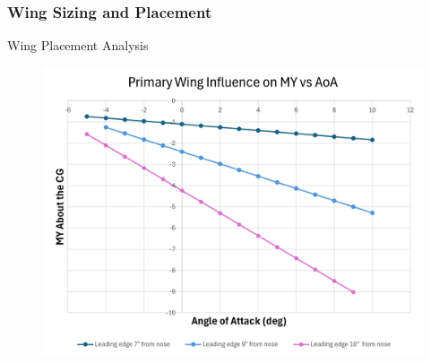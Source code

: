 \documentclass{beamer}
\newcommand{\setpresentername}[1]{\renewcommand{\presentername}{#1}}
\newcommand{\setpresentertitle}[1]{\renewcommand{\presentertitle}{#1}}
\newcommand{\presentername}{}
\newcommand{\presentertitle}{}
\begin{document}
    \subsubsection{Wing Sizing and Placement}
    \setpresentername{Thomas Housley}
    \setpresentertitle{Lead Flight Performance Engineer}
    \begin{frame}{Wing Placement Analysis}
    \begin{figure}
        \centering
        \includegraphics[width=.9\linewidth]{figures/prettygraf.png}
    \end{figure}
    \end{frame}
\end{document}
